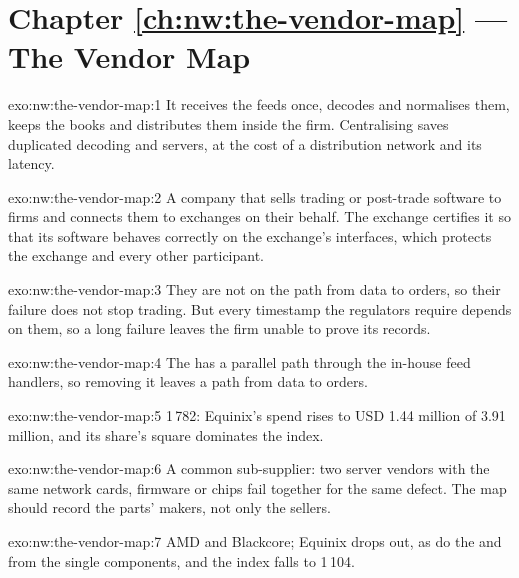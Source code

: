 \section*{Chapter \ref{ch:nw:the-vendor-map} --- The Vendor Map}

\begin{solution}{exo:nw:the-vendor-map:1}
It receives the feeds once, decodes and normalises them, keeps the books and distributes them inside the firm. Centralising saves
duplicated decoding and servers, at the cost of a distribution network and its latency.
\end{solution}

\begin{solution}{exo:nw:the-vendor-map:2}
A company that sells trading or post-trade software to firms and connects them to exchanges on their behalf. The exchange certifies it
so that its software behaves correctly on the exchange's interfaces, which protects the exchange and every other participant.
\end{solution}

\begin{solution}{exo:nw:the-vendor-map:3}
They are not on the path from data to orders, so their failure does not stop trading. But every timestamp the regulators require
depends on them, so a long failure leaves the firm unable to prove its records.
\end{solution}

\begin{solution}{exo:nw:the-vendor-map:4}
The  has a parallel path through the in-house feed handlers, so removing it leaves a path from data to orders.
\end{solution}

\begin{solution}{exo:nw:the-vendor-map:5}
1\,782: Equinix's spend rises to USD 1.44 million of 3.91 million, and its share's square dominates the index.
\end{solution}

\begin{solution}{exo:nw:the-vendor-map:6}
A common sub-supplier: two server vendors with the same network cards, firmware or chips fail together for the same defect. The map
should record the parts' makers, not only the sellers.
\end{solution}

\begin{solution}{exo:nw:the-vendor-map:7}
AMD and Blackcore; Equinix drops out, as do the  and  from the single components, and the index falls to 1\,104.
\end{solution}

